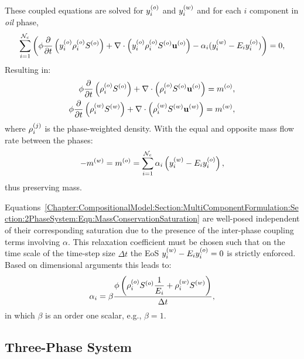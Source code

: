 These coupled equations are solved for $\mfr[y]{i}{o}$ and $\mfr[y]{i}{w}$ and for each $i$ component in {\it oil} phase, 
           \begin{equation}
              \summation_{i=1}^{{\cal N}_{c}} \bigg(\phi \displaystyle\frac{\partial}{\partial t}\left(\mfr[y]{i}{o}\mfr[\rho]{i}{o}\mfr[S]{}{o} \right) + \nabla\cdot\left(\mfr[y]{i}{o}\mfr[\rho]{i}{o}\mfr[S]{}{o}\mfr[\mathbf{u}]{}{o}  \right) - \alpha_i (\mfr[y]{i}{w} - E_i \mfr[y]{i}{o})\bigg)  = 0, 
           \end{equation}
Resulting in:
           \begin{eqnarray}
              \phi \displaystyle\frac{\partial}{\partial t}\left( \mfr[\rho]{i}{o}\mfr[S]{}{o} \right) + \nabla\cdot\left(\mfr[\rho]{i}{o}\mfr[S]{}{o}\mfr[\mathbf{u}]{}{o}  \right) = \mfr[m]{}{o}, \nonumber \\
              \phi \displaystyle\frac{\partial}{\partial t}\left( \mfr[\rho]{i}{w}\mfr[S]{}{w} \right) + \nabla\cdot\left(\mfr[\rho]{i}{w}\mfr[S]{}{w}\mfr[\mathbf{u}]{}{w}  \right) = \mfr[m]{}{w}, \nonumber 
           \end{eqnarray}
where $\mfr[\rho]{i}{j}$ is the phase-weighted density. With the equal and opposite mass flow rate between the phases: 
           \begin{displaymath}
                -\mfr[m]{}{w} = \mfr[m]{}{o}= \summation_{i=1}^{{\cal N}_{c}}\alpha_i \left(\mfr[y]{i}{w} - E_i \mfr[y]{i}{o}\right), 
           \end{displaymath}
thus preserving mass.


Equations~\ref{Chapter:CompositionalModel:Section:MultiComponentFormulation:Section:2PhaseSystem:Eqn:MassConservationSaturation} are well-posed independent of their corresponding saturation due to the presence of the inter-phase coupling terms involving $\alpha$. This relaxation coefficient \blue{$\alpha$} must be chosen such that on the time scale of the time-step size $\Delta t$ the EoS $\mfr[y]{i}{w} - E_i \mfr[y]{i}{o}=0$ is strictly enforced. Based on dimensional arguments this leads to: 
            \begin{equation}
               \alpha_{i}= \beta \frc{\phi \left(\mfr[\rho]{i}{o}\mfr[S]{}{o} \frc{1}{E_i} +\mfr[\rho]{i}{w}\mfr[S]{}{w} \right)}{\Delta t} ,
            \end{equation}
in which $\beta$ is an order one scalar, e.g., $\beta=1$.


\subsection{Three-Phase System}\label{Chapter:CompositionalModel:Section:MultiComponentFormulation:Section:3PhaseSystem}

